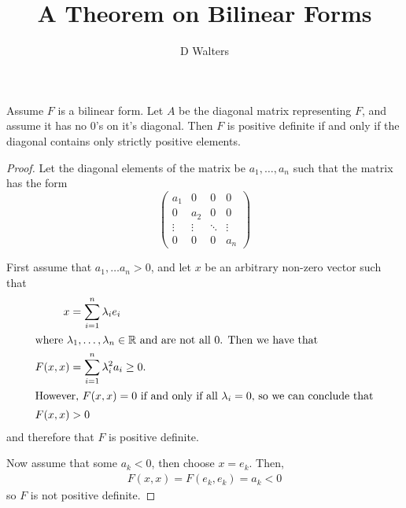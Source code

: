 \documentclass{article}
\title{A Theorem on Bilinear Forms}
\author{D Walters}
\begin{document}
\maketitle
    \begin{theorem}
 Assume \(F\) is a bilinear form. Let \(A\) be the diagonal matrix representing \(F\), and assume it has no \(0\)'s on it's diagonal.
 Then \(F\) is positive definite if and only if the diagonal contains only strictly positive elements.
    \end{theorem}
    \begin{proof}
      Let the diagonal elements of the matrix be \(a_{1}, \ldots,a_{n}\) such that the matrix has the form
      \begin{equation}
\begin{pmatrix}
  a_{1} & 0 & 0 & 0\\
  0 & a_{2} & 0 & 0 \\
  \vdots & \vdots & \ddots & \vdots \\
  0 & 0 & 0 & a_{n}
\end{pmatrix}
      \end{equation}

      First assume that \(a_{1},\ldots a_{n} > 0\), and let \(x\) be an arbitrary non-zero vector such that
      \begin{align}
        x&=\sum_{i=1}^{n}\lambda_{i}e_{i}\\
      \intertext{where \(\lambda_{1},\ldots, \lambda_{n}\in \mathbb{R}\) and are not all \(0\). Then we have that}
        F(x,x) &= \sum_{i=1}^{n}\lambda_{i}^{2}a_{i} \geq 0.\\
                 \intertext{However, \(F(x,x)=0\) if and only if all \(\lambda_{i}=0\), so we can conclude that}
        F(x,x) &> 0
      \end{align}
      and therefore that \(F\) is positive definite.

      Now assume that some \(a_{k} < 0\), then choose \(x=e_{k}\). Then,
      \begin{align}
F(x,x)=F(e_{k},e_{k})=a_{k}<0
      \end{align}
      so \(F\) is not positive definite.

    \end{proof}
\end{document}
